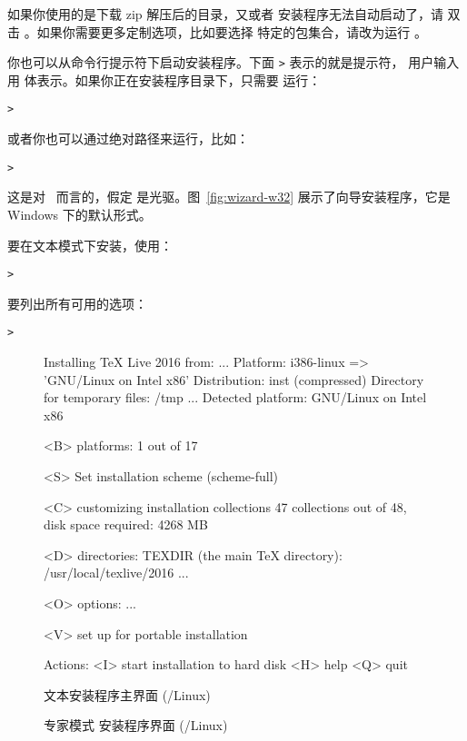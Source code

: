 \documentclass{article}
\begin{document}
如果你使用的是下载 zip 解压后的目录，又或者 \DVD 安装程序无法自动启动了，请
双击 。如果你需要更多定制选项，比如要选择
特定的包集合，请改为运行 。

你也可以从命令行提示符下启动安装程序。下面 \texttt{>} 表示的就是提示符，
用户输入用  体表示。如果你正在安装程序目录下，只需要
运行：
\begin{alltt}
> 
\end{alltt}

或者你也可以通过绝对路径来运行，比如：
\begin{alltt}
> 
\end{alltt}
这是对 \TK\ \DVD 而言的，假定  是光驱。图~\ref{fig:wizard-w32}
展示了向导安装程序，它是 Windows 下的默认形式。

要在文本模式下安装，使用：
\begin{alltt}
> 
\end{alltt}

要列出所有可用的选项：
\begin{alltt}
> 
\end{alltt}

\begin{figure}[tb]
\begin{boxedverbatim}
Installing TeX Live 2016 from: ...
Platform: i386-linux => 'GNU/Linux on Intel x86'
Distribution: inst (compressed)
Directory for temporary files: /tmp
...
 Detected platform: GNU/Linux on Intel x86

 <B> platforms: 1 out of 17

 <S> Set installation scheme (scheme-full)

 <C> customizing installation collections
     47 collections out of 48, disk space required: 4268 MB

 <D> directories:
   TEXDIR (the main TeX directory):
     /usr/local/texlive/2016
   ...

 <O> options:
   ...

 <V> set up for portable installation

Actions:
 <I> start installation to hard disk
 <H> help
 <Q> quit
\end{boxedverbatim}
\caption{文本安装程序主界面 (\GNU/Linux)}\label{fig:text-main}
\end{figure}

\begin{figure}[tb]
\caption{专家模式 \GUI{} 安装程序界面 (\GNU/Linux)}\label{fig:gui-main}
\end{figure}
\end{document}
